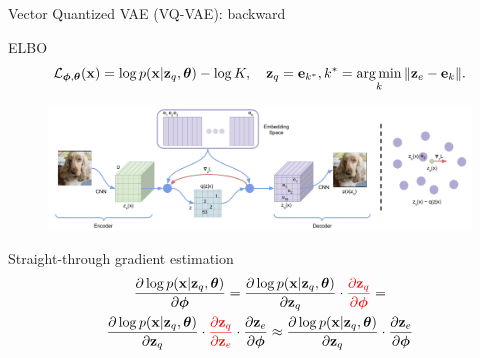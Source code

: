 \begin{frame}{Vector Quantized VAE (VQ-VAE): backward}
	\begin{block}{ELBO}
		\vspace{-0.5cm}
		\[
			\mathcal{L}_{\boldsymbol{\phi}, \boldsymbol{\theta}}(\mathbf{x})  =  \log p(\mathbf{x} | \mathbf{z}_q, \boldsymbol{\theta}) - \log K, \quad \mathbf{z}_q = \mathbf{e}_{k^*}, k^* = \operatorname*{arg\,min}_k \| \mathbf{z}_e - \mathbf{e}_k \|.
		\]
		\vspace{-0.5cm}
	\end{block}
	\begin{figure}
		\centering
		\includegraphics[width=0.85\linewidth]{figs/vqvae}
	\end{figure}
	\vspace{-0.3cm}
	\begin{block}{Straight-through gradient estimation}
		\vspace{-0.5cm}
		\begin{multline*}
		\frac{\partial \log p(\mathbf{x} | \mathbf{z}_q , \boldsymbol{\theta})}{\partial \boldsymbol{\phi}} = \frac{\partial \log p(\mathbf{x} | \mathbf{z}_q, \boldsymbol{\theta})}{\partial \mathbf{z}_q} \cdot {\color{red}\frac{\partial \mathbf{z}_q}{\partial \boldsymbol{\phi}}} = \\
		\frac{\partial \log p(\mathbf{x} | \mathbf{z}_q, \boldsymbol{\theta})}{\partial \mathbf{z}_q} \cdot {\color{red}\frac{\partial \mathbf{z}_q}{\partial \mathbf{z}_e}} \cdot \frac{\partial \mathbf{z}_e}{\partial \boldsymbol{\phi}} \approx \frac{\partial \log p(\mathbf{x} | \mathbf{z}_q, \boldsymbol{\theta})}{\partial \mathbf{z}_q} \cdot \frac{\partial \mathbf{z}_e}{\partial \boldsymbol{\phi}}
		\end{multline*}
	\end{block}
\end{frame}
